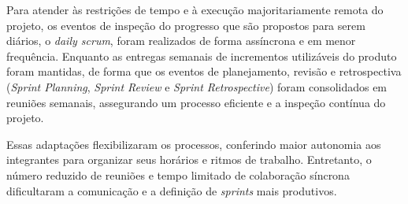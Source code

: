 \documentclass[
	12pt,				%
	openany,			%
	oneside,			%
	a4paper,			%
	english,			%
	french,				%
	spanish,			%
	brazil				%
	]{abntex2}
\begin{document}
Para atender às restrições de tempo e à execução majoritariamente remota do projeto, os eventos de inspeção do progresso que são propostos para serem diários, o \textit{daily scrum},  foram realizados de forma assíncrona e em menor frequência. Enquanto  as entregas semanais de incrementos utilizáveis do produto foram mantidas, de forma que os eventos de planejamento, revisão e retrospectiva (\textit{Sprint Planning}, \textit{Sprint Review} e \textit{Sprint Retrospective}) foram consolidados em reuniões semanais, assegurando um processo eficiente e a inspeção contínua do projeto. 

Essas adaptações flexibilizaram os processos, conferindo maior autonomia aos integrantes para organizar seus horários e ritmos de trabalho. Entretanto, o número reduzido de reuniões e tempo limitado de colaboração síncrona dificultaram a comunicação e a definição de \textit{sprints} mais produtivos.
\end{document}
